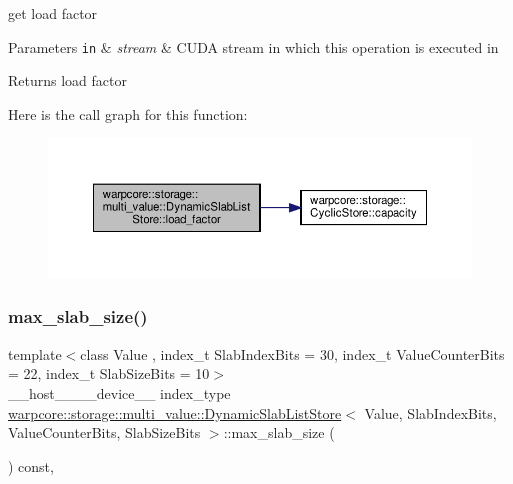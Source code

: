 get load factor 


\begin{DoxyParams}[1]{Parameters}
\mbox{\tt in}  & {\em stream} & C\+U\+DA stream in which this operation is executed in \\
\hline
\end{DoxyParams}
\begin{DoxyReturn}{Returns}
load factor 
\end{DoxyReturn}
Here is the call graph for this function\+:
\nopagebreak
\begin{figure}[H]
\begin{center}
\leavevmode
\includegraphics[width=350pt]{classwarpcore_1_1storage_1_1multi__value_1_1DynamicSlabListStore_ab9e38febbac249da5662580311a76f06_cgraph}
\end{center}
\end{figure}
\mbox{\label{classwarpcore_1_1storage_1_1multi__value_1_1DynamicSlabListStore_a58f11e19acf684db903b7985364ec73c}} 
\subsubsection{\texorpdfstring{max\+\_\+slab\+\_\+size()}{max\_slab\_size()}}
{\footnotesize\ttfamily template$<$class Value , index\+\_\+t Slab\+Index\+Bits = 30, index\+\_\+t Value\+Counter\+Bits = 22, index\+\_\+t Slab\+Size\+Bits = 10$>$ \\
\+\_\+\+\_\+host\+\_\+\+\_\+\+\_\+\+\_\+device\+\_\+\+\_\+ index\+\_\+type \hyperlink{classwarpcore_1_1storage_1_1multi__value_1_1DynamicSlabListStore}{warpcore\+::storage\+::multi\+\_\+value\+::\+Dynamic\+Slab\+List\+Store}$<$ Value, Slab\+Index\+Bits, Value\+Counter\+Bits, Slab\+Size\+Bits $>$\+::max\+\_\+slab\+\_\+size (\begin{DoxyParamCaption}{ }\end{DoxyParamCaption}) const\hspace{0.3cm}{\ttfamily [inline]}, {\ttfamily [noexcept]}}



